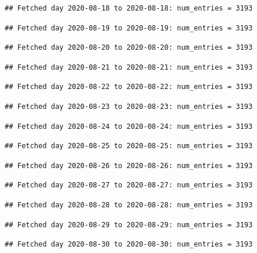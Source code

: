 \documentclass[]{article}
\begin{document}
\begin{verbatim}
## Fetched day 2020-08-18 to 2020-08-18: num_entries = 3193
\end{verbatim}

\begin{verbatim}
## Fetched day 2020-08-19 to 2020-08-19: num_entries = 3193
\end{verbatim}

\begin{verbatim}
## Fetched day 2020-08-20 to 2020-08-20: num_entries = 3193
\end{verbatim}

\begin{verbatim}
## Fetched day 2020-08-21 to 2020-08-21: num_entries = 3193
\end{verbatim}

\begin{verbatim}
## Fetched day 2020-08-22 to 2020-08-22: num_entries = 3193
\end{verbatim}

\begin{verbatim}
## Fetched day 2020-08-23 to 2020-08-23: num_entries = 3193
\end{verbatim}

\begin{verbatim}
## Fetched day 2020-08-24 to 2020-08-24: num_entries = 3193
\end{verbatim}

\begin{verbatim}
## Fetched day 2020-08-25 to 2020-08-25: num_entries = 3193
\end{verbatim}

\begin{verbatim}
## Fetched day 2020-08-26 to 2020-08-26: num_entries = 3193
\end{verbatim}

\begin{verbatim}
## Fetched day 2020-08-27 to 2020-08-27: num_entries = 3193
\end{verbatim}

\begin{verbatim}
## Fetched day 2020-08-28 to 2020-08-28: num_entries = 3193
\end{verbatim}

\begin{verbatim}
## Fetched day 2020-08-29 to 2020-08-29: num_entries = 3193
\end{verbatim}

\begin{verbatim}
## Fetched day 2020-08-30 to 2020-08-30: num_entries = 3193
\end{verbatim}
\end{document}
